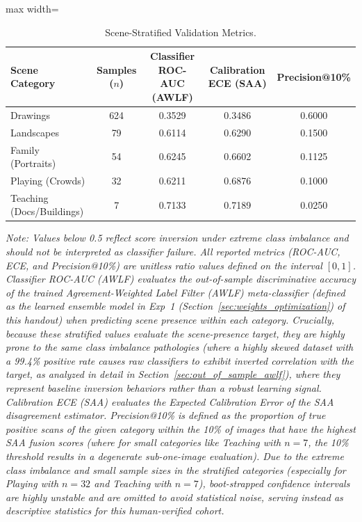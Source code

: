 \documentclass[11pt,a4paper]{article}
\begin{document}
\begin{table}[htbp]
\centering
\caption{Scene-Stratified Validation Metrics.}
\label{tab:stratified_val}
\begin{adjustbox}{max width=\linewidth}
\begin{tabular}{lcccc}
\toprule
\textbf{Scene Category} & \textbf{Samples ($n$)} & \textbf{Classifier ROC-AUC (AWLF)} & \textbf{Calibration ECE (SAA)} & \textbf{Precision@10\%} \\
\midrule
Drawings & 624 & 0.3529 & 0.3486 & 0.6000 \\
Landscapes & 79 & 0.6114 & 0.6290 & 0.1500 \\
Family (Portraits) & 54 & 0.6245 & 0.6602 & 0.1125 \\
Playing (Crowds) & 32 & 0.6211 & 0.6876 & 0.1000 \\
Teaching (Docs/Buildings) & 7 & 0.7133 & 0.7189 & 0.0250 \\
\bottomrule
\end{tabular}
\end{adjustbox}
\begin{flushleft}
\small{\textit{Note: Values below 0.5 reflect score inversion under extreme class imbalance and should not be interpreted as classifier failure. All reported metrics (ROC-AUC, ECE, and Precision@10\%) are unitless ratio values defined on the interval $[0, 1]$. Classifier ROC-AUC (AWLF) evaluates the out-of-sample discriminative accuracy of the trained Agreement-Weighted Label Filter (AWLF) meta-classifier (defined as the learned ensemble model in Exp~1 (Section~\ref{sec:weights_optimization}) of this handout) when predicting scene presence within each category. Crucially, because these stratified values evaluate the scene-presence target, they are highly prone to the same class imbalance pathologies (where a highly skewed dataset with a 99.4\% positive rate causes raw classifiers to exhibit inverted correlation with the target, as analyzed in detail in Section~\ref{sec:out_of_sample_awlf}), where they represent baseline inversion behaviors rather than a robust learning signal. Calibration ECE (SAA) evaluates the Expected Calibration Error of the SAA disagreement estimator. Precision@10\% is defined as the proportion of true positive scans of the given category within the 10\% of images that have the highest SAA fusion scores (where for small categories like Teaching with $n=7$, the 10\% threshold results in a degenerate sub-one-image evaluation). Due to the extreme class imbalance and small sample sizes in the stratified categories (especially for Playing with $n=32$ and Teaching with $n=7$), boot-strapped confidence intervals are highly unstable and are omitted to avoid statistical noise, serving instead as descriptive statistics for this human-verified cohort.}}
\end{flushleft}
\end{table}
\end{document}
